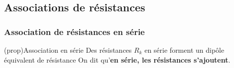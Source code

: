 \documentclass[../../main/main.tex]{subfiles}
\begin{document}
\vspace{-10pt}
\subsection{Associations de résistances}
\subsubsection{Association de résistances en série}
\begin{tcb*}[label=prop:rserie, sidebyside,
		righthand ratio=.4](prop){Association en série}
	Des résistances $R_k$ en série forment un dipôle équivalent de
	résistance
	\psw{%
		\[
			\boxed{R\ind{eq} = \sum_k R_k}
		\]
	}%
	On dit qu'\textbf{en série, les résistances s'ajoutent}.
	\tcblower
	\begin{center}
	\end{center}
\end{tcb*}
\end{document}
